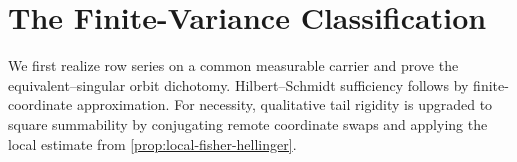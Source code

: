 \section{The Finite-Variance Classification}
\label{sec:finite-variance-equivalence-and-global-rigidity}

We first realize row series on a common measurable carrier and prove the
equivalent--singular orbit dichotomy.  Hilbert--Schmidt sufficiency follows by
finite-coordinate approximation.  For necessity, qualitative tail rigidity is
upgraded to square summability by conjugating remote coordinate swaps and
applying the local estimate from \cref{prop:local-fisher-hellinger}.



